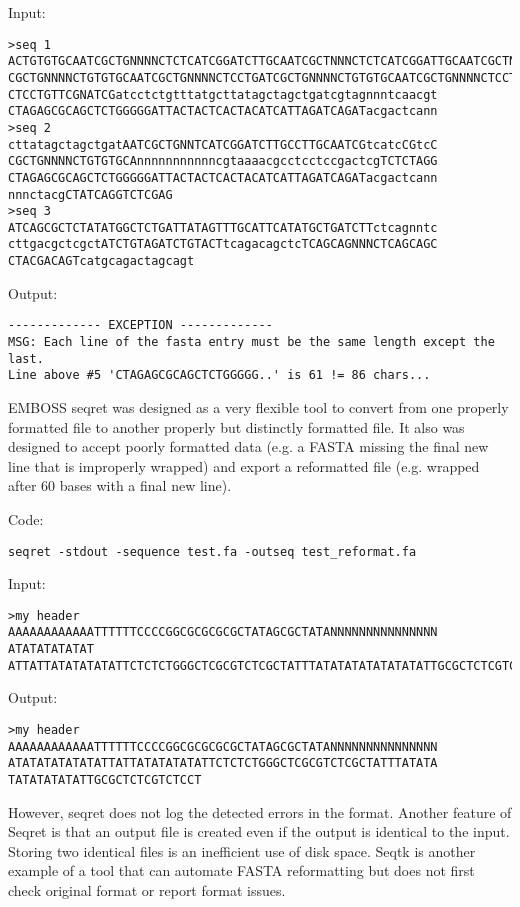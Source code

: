 \documentclass{bmcart}
\begin{document}
Input: 
\begin{verbatim}
>seq 1
ACTGTGTGCAATCGCTGNNNNCTCTCATCGGATCTTGCAATCGCTNNNCTCTCATCGGATTGCAATCGCTNNNCTtcatcCGGAT
CGCTGNNNNCTGTGTGCAATCGCTGNNNNCTCCTGATCGCTGNNNNCTGTGTGCAATCGCTGNNNNCTCCTGCAATCGCTGNNNN
CTCCTGTTCGNATCGatcctctgtttatgcttatagctagctgatcgtagnnntcaacgt
CTAGAGCGCAGCTCTGGGGGATTACTACTCACTACATCATTAGATCAGATacgactcann
>seq 2
cttatagctagctgatAATCGCTGNNTCATCGGATCTTGCCTTGCAATCGtcatcCGtcC
CGCTGNNNNCTGTGTGCAnnnnnnnnnnncgtaaaacgcctcctccgactcgTCTCTAGG
CTAGAGCGCAGCTCTGGGGGATTACTACTCACTACATCATTAGATCAGATacgactcann
nnnctacgCTATCAGGTCTCGAG
>seq 3
ATCAGCGCTCTATATGGCTCTGATTATAGTTTGCATTCATATGCTGATCTTctcagnntc
cttgacgctcgctATCTGTAGATCTGTACTtcagacagctcTCAGCAGNNNCTCAGCAGC
CTACGACAGTcatgcagactagcagt
\end{verbatim}

Output:
\begin{verbatim}
------------- EXCEPTION -------------
MSG: Each line of the fasta entry must be the same length except the last. 
Line above #5 'CTAGAGCGCAGCTCTGGGGG..' is 61 != 86 chars...
\end{verbatim}

EMBOSS seqret was designed as a very flexible tool to convert from one properly formatted file to another properly but distinctly formatted file. It also was designed to accept poorly formatted data (e.g. a FASTA missing the final new line that is improperly wrapped) and export a reformatted file (e.g. wrapped after 60 bases with a final new line).

Code:

\begin{verbatim}
seqret -stdout -sequence test.fa -outseq test_reformat.fa
\end{verbatim}

Input:

\begin{verbatim}
>my header
AAAAAAAAAAAATTTTTTCCCCGGCGCGCGCGCTATAGCGCTATANNNNNNNNNNNNNNN
ATATATATATAT
ATTATTATATATATATTCTCTCTGGGCTCGCGTCTCGCTATTTATATATATATATATATTGCGCTCTCGTCTCCT\end{verbatim}

Output:

\begin{verbatim}
>my header
AAAAAAAAAAAATTTTTTCCCCGGCGCGCGCGCTATAGCGCTATANNNNNNNNNNNNNNN
ATATATATATATATTATTATATATATATTCTCTCTGGGCTCGCGTCTCGCTATTTATATA
TATATATATATTGCGCTCTCGTCTCCT
\end{verbatim}

However, seqret does not log the detected errors in the format. Another feature of Seqret is that an output file is created even if the output is identical to the input. Storing two identical files is an inefficient use of disk space. Seqtk \cite{Li2013} is another example of a tool that can automate FASTA reformatting but does not first check original format or report format issues. 
\end{document}
